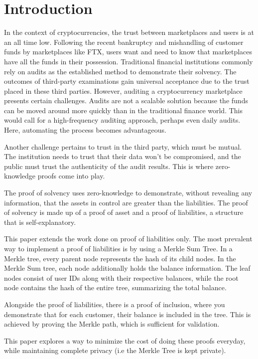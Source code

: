 
\chapter{Introduction}

In the context of cryptocurrencies, the trust between marketplaces and users is at an all time low. Following the recent bankruptcy and mishandling of customer funds by marketplaces like FTX, users want and need to know that marketplaces have all the funds in their possession. 
Traditional financial institutions commonly rely on audits as the established method to demonstrate their solvency. The outcomes of third-party examinations gain universal acceptance due to the trust placed in these third parties. However, auditing a cryptocurrency marketplace presents certain challenges. 
Audits are not a scalable solution because the funds can be moved around more quickly than in the traditional finance world. This would call for a high-frequency auditing approach, perhaps even daily audits. Here, automating the process becomes advantageous.

Another challenge pertains to trust in the third party, which must be mutual. The institution needs to trust that their data won't be compromised, and the public must trust the authenticity of the audit results. This is where zero-knowledge proofs come into play. 

The proof of solvency uses zero-knowledge to demonstrate, without revealing any information, that the assets in control are greater than the liabilities. The proof of solvency is made up of a proof of asset and a proof of liabilities, a structure that is self-explanatory.

This paper extends the work done on proof of liabilities only. The most prevalent way to implement a proof of liabilities is by using a Merkle Sum Tree. 
In a Merkle tree, every parent node represents the hash of its child nodes. In the Merkle Sum tree, each node additionally holds the balance information. The leaf nodes consist of user IDs along with their respective balances, while the root node contains the hash of the entire tree, summarizing the total balance.

Alongside the proof of liabilities, there is a proof of inclusion, where you demonstrate that for each customer, their balance is included in the tree. This is achieved by proving the Merkle path, which is sufficient for validation.

This paper explores a way to minimize the cost of doing these proofs everyday, while maintaining complete privacy (i.e the Merkle Tree is kept private).



